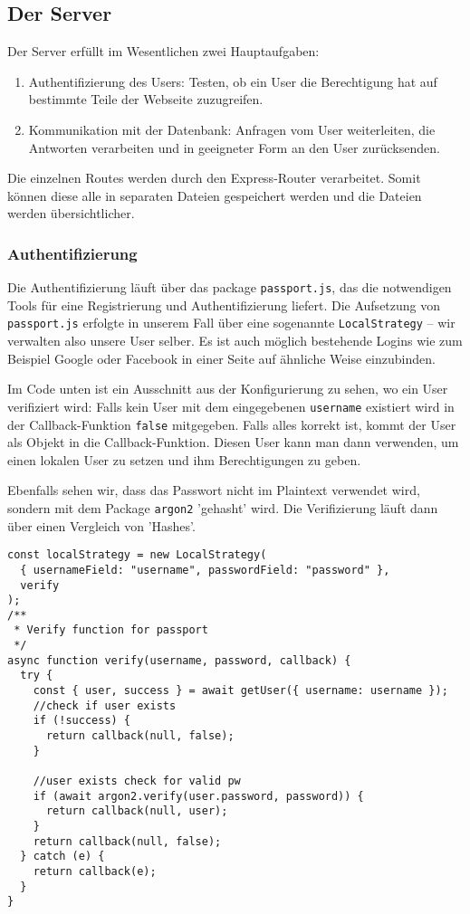 \subsection{Der Server}

Der Server erfüllt im Wesentlichen zwei Hauptaufgaben:
\begin{enumerate}
    \item Authentifizierung des Users: Testen, ob ein User die Berechtigung hat auf bestimmte Teile der Webseite zuzugreifen.
    \item Kommunikation mit der Datenbank: Anfragen vom User weiterleiten, die Antworten verarbeiten und in geeigneter Form an den User zurücksenden.
\end{enumerate}

Die einzelnen Routes werden durch den Express-Router verarbeitet. Somit können diese alle in separaten Dateien gespeichert werden und die Dateien werden übersichtlicher.

\subsubsection{Authentifizierung}
Die Authentifizierung läuft über das package \verb|passport.js|, das die notwendigen Tools für eine Registrierung und Authentifizierung liefert. Die Aufsetzung von \verb|passport.js| erfolgte in unserem Fall über eine sogenannte \verb|LocalStrategy| -- wir verwalten also unsere User selber. Es ist auch möglich bestehende Logins wie zum Beispiel Google oder Facebook in einer Seite auf ähnliche Weise einzubinden. 

Im Code unten ist ein Ausschnitt aus der Konfigurierung zu sehen, wo ein User verifiziert wird: Falls kein User mit dem eingegebenen \verb|username| existiert wird in der Callback-Funktion \verb|false| mitgegeben. Falls alles korrekt ist, kommt der User als Objekt in die Callback-Funktion. Diesen User kann man dann verwenden, um einen lokalen User zu setzen und ihm Berechtigungen zu geben.

Ebenfalls sehen wir, dass das Passwort nicht im Plaintext verwendet wird, sondern mit dem Package \verb|argon2| 'gehasht' wird. Die Verifizierung läuft dann über einen Vergleich von 'Hashes'. 

 \newpage

\begin{lstlisting}
const localStrategy = new LocalStrategy(
  { usernameField: "username", passwordField: "password" },
  verify
);
/**
 * Verify function for passport
 */
async function verify(username, password, callback) {
  try {
    const { user, success } = await getUser({ username: username });
    //check if user exists
    if (!success) {
      return callback(null, false);
    }

    //user exists check for valid pw
    if (await argon2.verify(user.password, password)) {
      return callback(null, user);
    }
    return callback(null, false);
  } catch (e) {
    return callback(e);
  }
}
\end{lstlisting}

